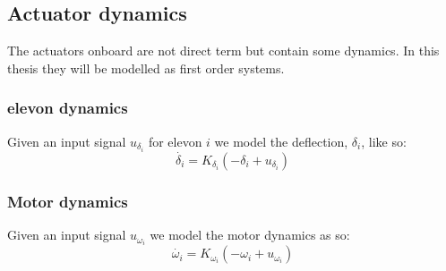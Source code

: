 \subsection{Actuator dynamics}
The actuators onboard are not direct term but contain some dynamics.
In this thesis they will be modelled as first order systems.
\subsubsection{elevon dynamics}
Given an input signal $u_{\delta_i}$ for elevon $i$ we model the deflection, $\delta_i$, like so:
\begin{equation}
    \dot{\delta_i} = K_{\delta_i} (-\delta_i + u_{\delta_i})
\end{equation}

\subsubsection{Motor dynamics}
Given an input signal $u_{\omega_i}$ we model the motor dynamics as so:
\begin{equation}
    \dot{\omega_i} =  K_{\omega_i}(-\omega_i + u_{\omega_i})
\end{equation}